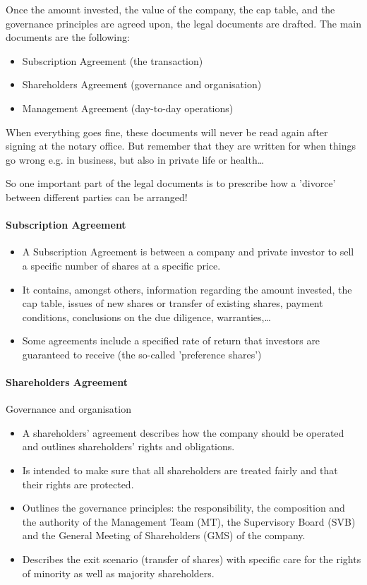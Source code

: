 Once the amount invested, the value of the company, the cap table, and the
governance principles are agreed upon, the legal documents are drafted.
The main documents are the following:
\begin{itemize}
    \item Subscription Agreement (the transaction)
    \item Shareholders Agreement (governance and organisation)
    \item Management Agreement (day-to-day operations)
\end{itemize}
When everything goes fine, these documents will never be read again after signing
at the notary office. But remember that they are written for when things go wrong
e.g. in business, but also in private life or health\dots

So one important part of the legal documents is to prescribe how a 'divorce'
between different parties can be arranged!

\paragraph{Subscription Agreement}

\begin{itemize}
    \item A Subscription Agreement is between a company and private investor to
        sell a specific number of shares at a specific price.
    \item It contains, amongst others, information regarding the amount
        invested, the cap table, issues of new shares or transfer of
        existing shares, payment conditions, conclusions on the due diligence,
        warranties,\dots
    \item Some agreements include a specified rate of return that investors
        are guaranteed to receive (the so-called 'preference shares')
\end{itemize}

\paragraph{Shareholders Agreement} Governance and organisation

\begin{itemize}
    \item A shareholders' agreement describes how the company should be operated
        and outlines shareholders' rights and obligations.
    \item Is intended to make sure that all shareholders are treated fairly
        and that their rights are protected.
    \item Outlines the governance principles: the responsibility, the
        composition and the authority of the Management Team (MT), the
        Supervisory Board (SVB) and the General Meeting of Shareholders
        (GMS) of the company.
    \item Describes the exit scenario (transfer of shares) with specific care
        for the rights of minority as well as majority shareholders.
\end{itemize}

